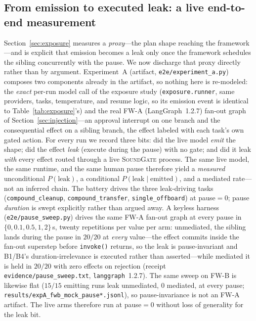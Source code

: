 \documentclass[10pt,journal,compsoc]{IEEEtran}
\newcommand{\sys}{\textsc{SoundGate}}
\begin{document}
\subsection{From emission to executed leak: a live end-to-end measurement}
\label{sec:expA}
Section~\ref{sec:exposure} measures a \emph{proxy}---the plan shape reaching the
framework---and is explicit that emission becomes a leak only once the framework
schedules the sibling concurrently with the pause. We now discharge that proxy
directly rather than by argument. Experiment~A (artifact,
\texttt{e2e/experiment\_a.py}) composes two components already in the artifact,
so nothing here is re-modeled: the \emph{exact} per-run model call of the
exposure study (\texttt{exposure.runner}, same providers, tasks, temperature,
and resume logic, so its emission event is identical to
Table~\ref{tab:exposure}'s) and the real \textsf{FW-A} (LangGraph~1.2.7)
fan-out graph of Section~\ref{sec:injection}---an approval interrupt on one
branch and the consequential effect on a sibling branch, the effect labeled
with each task's own gated action. For every run we record three bits: did the
live model \emph{emit} the shape; did the effect \emph{leak} (execute during the
pause) with no gate; and did it leak \emph{with} every effect routed through a
live \sys{} process. The same live model, the same runtime, and the same human
pause therefore yield a \emph{measured} unconditional $P(\mathrm{leak})$, a
conditional $P(\mathrm{leak}\mid\mathrm{emitted})$, and a mediated rate---not an
inferred chain. The battery drives the three leak-driving tasks (\texttt{compound\_cleanup}, \texttt{compound\_transfer}, \texttt{single\_offboard}) at pause${=}0$; pause \emph{duration} is swept explicitly rather than argued away. A keyless harness (\texttt{e2e/pause\_sweep.py}) drives the same \textsf{FW-A} fan-out graph at every pause in $\{0, 0.1, 0.5, 1, 2\}$\,s, twenty repetitions per value per arm: unmediated, the sibling lands during the pause in $20/20$ at \emph{every} value---the effect commits inside the fan-out superstep before \texttt{invoke()} returns, so the leak is pause-invariant and B1/B4's duration-irrelevance is executed rather than asserted---while mediated it is held in $20/20$ with zero effects on rejection (receipt \texttt{evidence/pause\_sweep.txt}, \texttt{langgraph}~1.2.7). The same sweep on \textsf{FW-B} is likewise flat ($15/15$ emitting runs leak unmediated, $0$ mediated, at every pause; \texttt{results/expA\_fwb\_mock\_pause*.jsonl}), so pause-invariance is not an \textsf{FW-A} artifact. The live arms therefore run at pause${=}0$ without loss of generality for the leak bit.
\end{document}
